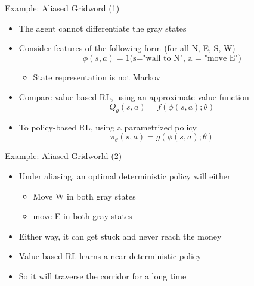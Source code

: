 \begin{frame}[c]{Example: Aliased Gridword (1)}
	
	\begin{itemize}
		\item The agent \alert{cannot} differentiate the gray states
		\item Consider features of the following form (for all N, E, S, W)
		$$\phi(s,a) = 1\text{(s="wall to N", a = "move E")}$$
		\vspace{-1em}
		\begin{itemize}
			\item State representation is not Markov
		\end{itemize}
		\item Compare value-based RL, using an approximate value function
		$$Q_\theta (s,a) = f(\phi(s,a); \theta)$$
		\item To policy-based RL, using a parametrized policy
		$$\pi_\theta(s,a) = g(\phi(s,a); \theta) $$ 
	\end{itemize}
	
\end{frame}
\begin{frame}[c]{Example: Aliased Gridworld (2)}
	
	\begin{itemize}
		\item Under aliasing, an optimal \alert{deterministic} policy will either
		\begin{itemize}
			\item Move W in both gray states 
			\item move E in both gray states
		\end{itemize}
		\item Either way, it can get stuck and never reach the money
		\item Value-based RL learns a near-deterministic policy
		\item So it will traverse the corridor for a long time
	\end{itemize}

\end{frame}
